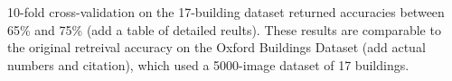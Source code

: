 10-fold cross-validation on the 17-building dataset returned accuracies between 65\% and 75\% (add a table of detailed reults). These results are comparable to the original retreival accuracy on the Oxford Buildings Dataset (add actual numbers and citation), which used a 5000-image dataset of 17 buildings.